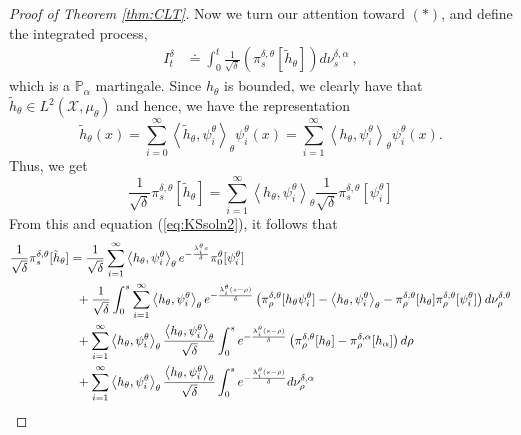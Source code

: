 \documentclass{article}
\begin{document}
\begin{proof} [Proof of Theorem \ref{thm:CLT}]
Now we turn our attention toward $(*)$, and define the integrated process,
\begin{align*}
I_{t}^{\delta} &\doteq\int_0^t\frac{1}{\sqrt\delta}\left( \pi_s^{\delta,\theta}[\tilde h_{\theta}]\right)d\nu_s^{\delta,\alpha}\ ,
\end{align*}
which is a $\mathbb P_\alpha$ martingale. Since $h_{\theta}$ is bounded, we clearly have that $\tilde{h}_{\theta}\in L^{2}(\mathcal{X},\mu_{\theta})$ and hence, we have the representation
\[
\tilde{h}_{\theta}(x)=\sum_{i=0}^{\infty}\left<\tilde{h}_{\theta},\psi_i^{\theta}\right>_{\theta} \psi_i^{\theta}(x)=\sum_{i=1}^{\infty}\left<h_{\theta},\psi_i^{\theta}\right>_{\theta} \psi_i^{\theta}(x).
\]
Thus, we get
\begin{equation}
\frac{1}{\sqrt\delta} \pi_s^{\delta,\theta}[\tilde h_{\theta}]= \sum_{i=1}^{\infty}\left<h_{\theta},\psi_i^{\theta}\right>_{\theta} \frac{1}{\sqrt\delta} \pi_s^{\delta,\theta}[\psi_i^{\theta}]
\end{equation}
From this and equation (\ref{eq:KSsoln2}), it follows that
\begin{align}
\frac{1}{\sqrt\delta}\pi_s^{\delta,\theta}[\tilde h_{\theta}]&=
\frac{1}{\sqrt\delta}\sum_{i=1}^{\infty}\left<h_{\theta},\psi_i^{\theta}\right>_{\theta}e^{-\frac{\lambda_i^{\theta} s}{\delta}}\pi_0^{\theta}[\psi_i^{\theta}]\nonumber\\
&\hspace{0.2cm}+\frac{1}{\sqrt\delta}\int_0^s \sum_{i=1}^{\infty}\left<h_{\theta},\psi_i^{\theta}\right>_{\theta} e^{-\frac{\lambda_i^{\theta}(s-\rho)}{\delta}}\left(\pi_\rho^{\delta,\theta}[h_{\theta}\psi_i^{\theta}]-\left<h_{\theta},\psi_i^{\theta}\right>_{\theta}
-\pi_\rho^{\delta,\theta}[h_{\theta}]\pi_\rho^{\delta,\theta}[\psi_i^{\theta}]
\right)d\nu_\rho^{\delta,\theta}\nonumber\\
&\hspace{0.2cm}+\sum_{i=1}^{\infty}\left<h_{\theta},\psi_i^{\theta}\right>_{\theta}\frac{\left<h_{\theta},\psi_i^{\theta}\right>_{\theta}}{\sqrt\delta}\int_0^s e^{-\frac{\lambda_i^{\theta}(s-\rho)}{\delta}}\left(\pi_\rho^{\delta,\theta}[h_{\theta}]-\pi_\rho^{\delta,\alpha}[h_{\alpha}]\right)d\rho\nonumber\\
&\hspace{0.2cm}+\sum_{i=1}^{\infty}\left<h_{\theta},\psi_i^{\theta}\right>_{\theta}\frac{\left<h_{\theta},\psi_i^{\theta}\right>_{\theta}}{\sqrt\delta}\int_0^s e^{-\frac{\lambda_i^{\theta}(s-\rho)}{\delta}}d\nu_\rho^{\delta,\alpha}\label{Eq:ForLastTerm0}
\end{align}


\end{proof}
\end{document}
